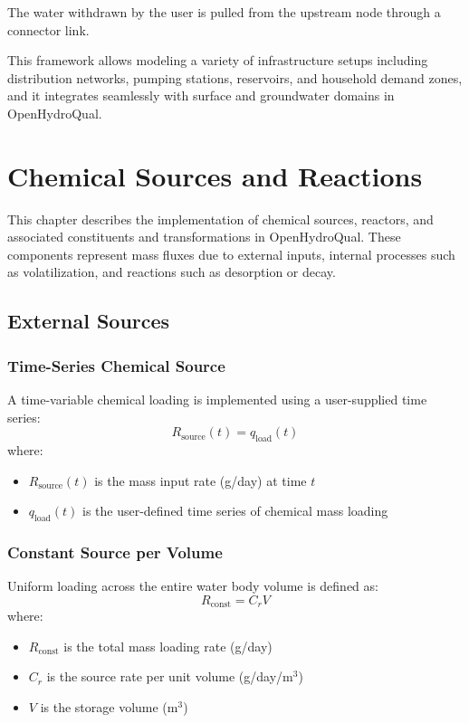\documentclass[12pt]{report}
\begin{document}
The water withdrawn by the user is pulled from the upstream node through a connector link.

\bigskip
This framework allows modeling a variety of infrastructure setups including distribution networks, pumping stations, reservoirs, and household demand zones, and it integrates seamlessly with surface and groundwater domains in OpenHydroQual.

\chapter{Chemical Sources and Reactions}

This chapter describes the implementation of chemical sources, reactors, and associated constituents and transformations in OpenHydroQual. These components represent mass fluxes due to external inputs, internal processes such as volatilization, and reactions such as desorption or decay.

\section{External Sources}

\subsection*{Time-Series Chemical Source}
A time-variable chemical loading is implemented using a user-supplied time series:
\begin{equation}
R_{\text{source}}(t) = q_{\text{load}}(t)
\end{equation}
where:
\begin{itemize}
  \item $R_{\text{source}}(t)$ is the mass input rate (g/day) at time $t$
  \item $q_{\text{load}}(t)$ is the user-defined time series of chemical mass loading
\end{itemize}

\subsection*{Constant Source per Volume}
Uniform loading across the entire water body volume is defined as:
\begin{equation}
R_{\text{const}} = C_r V
\end{equation}
where:
\begin{itemize}
  \item $R_{\text{const}}$ is the total mass loading rate (g/day)
  \item $C_r$ is the source rate per unit volume (g/day/m$^3$)
  \item $V$ is the storage volume (m$^3$)
\end{itemize}
\end{document}
